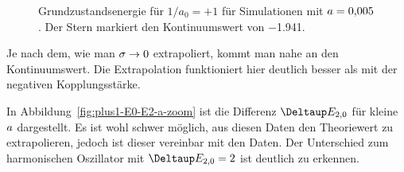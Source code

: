 \begin{figure}[htbp]
    \centering
    \caption{%
        Grundzustandsenergie für $1/a_0 = +1$ für Simulationen mit $a =
        \num{0.005}$. Der Stern markiert den Kontinuumswert von \num{-1.941}.
    }
    \label{fig:plus1-E0-sigma-0p005}
\end{figure}

Je nach dem, wie man $\sigma \to 0$ extrapoliert, kommt man nahe an den
Kontinuumswert. Die Extrapolation funktioniert hier deutlich besser als mit der
negativen Kopplungsstärke.

In Abbildung~\ref{fig:plus1-E0-E2-a-zoom} ist die Differenz $\Deltaup E_{2,0}$
für kleine $a$ dargestellt. Es ist wohl schwer möglich, aus diesen
Daten den Theoriewert zu extrapolieren, jedoch ist dieser vereinbar mit den
Daten. Der Unterschied zum harmonischen Oszillator mit $\Deltaup E_{2,0} = 2$
ist deutlich zu erkennen.


